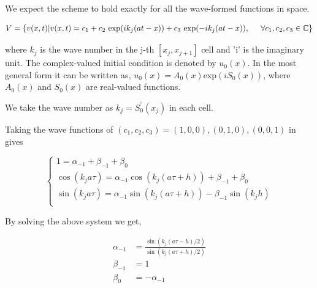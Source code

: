 We expect the scheme to hold exactly for all the wave-formed functions in space.

\begin{align}
 V = {\{} v(x,t)|v(x,t) =  c_{1} + c_{2}\text{ exp}(ik_{j}(at-x)) + c_{3}\text{ exp}(-ik_{j}(at-x)), \hspace{0.5cm} \forall c_{1}, c_{2}, c_{3} \in \mathbb{C} {\}}  
\end{align}

where $k_{j}$ is the wave number in the j-th $[x_{j},x_{j+1}]$ cell and 'i' is the imaginary unit.
The complex-valued initial condition is denoted by $u_{0}(x)$. In the most general form it can be written as,
$u_{0}(x) = A_{0}(x)\text{exp}(iS_{0}(x))$, where $A_{0}(x)$ and $S_{0}(x)$ are real-valued functions.


We take the wave number as $k_{j} = S^{'}_{0}(x_{j})$ in each cell.

Taking the wave functions of $(c_{1}, c_{2}, c_{3}) = (1,0,0), (0,1,0), (0,0,1)$ in gives


\[ \begin{cases} 
      1 = \alpha_{-1} + \beta_{-1} + \beta_{0} \\
      \cos(k_{j}a\tau) = \alpha_{-1}\cos(k_{j}(a\tau+h)) +\beta_{-1} + \beta_{0}\\
      \sin(k_{j}a\tau) =  \alpha_{-1}\sin(k_{j}(a\tau+h)) - \beta_{-1}\sin(k_{j}h)\\
   \end{cases}
\]

By solving the above system we get,

\begin{align*}
 \alpha_{-1} &= \frac{\sin(k_{j}(a\tau-h)/2)}{\sin(k_{j}(a\tau+h)/2)}\\
 \beta_{-1} &= 1\\
 \beta_{0} &= -\alpha_{-1}
\end{align*}

